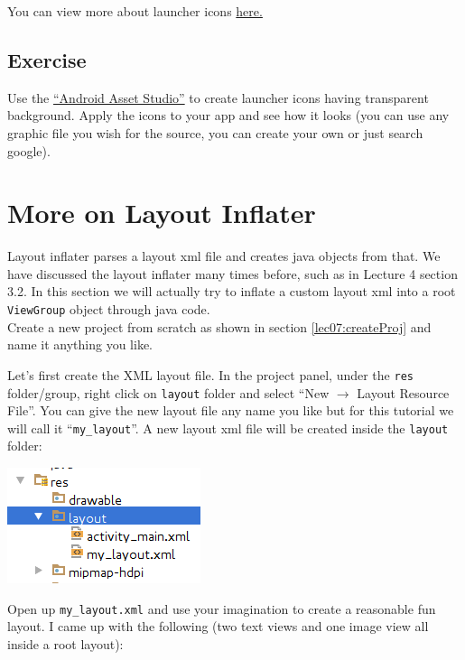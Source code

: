 You can view more about launcher icons \href{https://developer.android.com/guide/practices/ui_guidelines/icon_design_launcher.html}{here.}

\subsection{Exercise}
Use the \href{https://romannurik.github.io/AndroidAssetStudio/}{``Android Asset Studio''} to create launcher icons having transparent background. Apply the icons to your app and see how it looks (you can use any graphic file you wish for the source, you can create your own or just search google).

\section{More on Layout Inflater}
\label{lec07:moreOnInflater}
Layout inflater parses a layout xml file and creates java objects from that. We have discussed the layout inflater many times before, such as in Lecture 4 section 3.2. In this section we will actually try to inflate a custom layout xml into a root \texttt{ViewGroup} object through java code. \\

Create a new project from scratch as shown in section \ref{lec07:createProj} and name it anything you like.

Let's first create the XML layout file. In the project panel, under the \texttt{res} folder/group, right click on \texttt{layout} folder and select ``New $\rightarrow$ Layout Resource File''. You can give the new layout file any name you like but for this tutorial we will call it ``\texttt{my\_layout}''. A new layout xml file will be created inside the \texttt{layout} folder:

\begin{center}
	\includegraphics[scale=0.4]{chapters/ch06/images/30}
\end{center}

Open up \texttt{my\_layout.xml} and use your imagination to create a reasonable fun layout. I came up with the following (two text views and one image view all inside a root layout):

